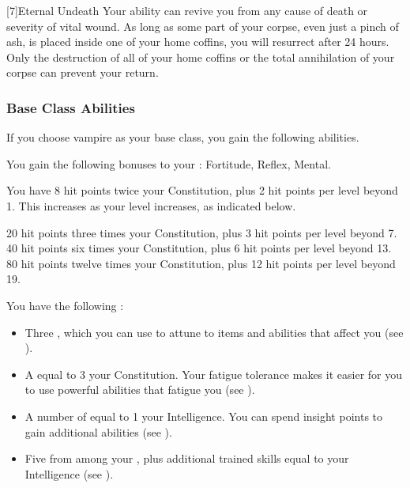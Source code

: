             [7]{Eternal Undeath} Your  ability can revive you from any cause of death or severity of vital wound.
            As long as some part of your corpse, even just a pinch of ash, is placed inside one of your home coffins, you will resurrect after 24 hours.
            Only the destruction of all of your home coffins or the total annihilation of your corpse can prevent your return.

        \subsubsection{Base Class Abilities}
            If you choose vampire as your base class, you gain the following abilities.

            You gain the following bonuses to your :  Fortitude,  Reflex,  Mental.

                You have 8 hit points \add twice your Constitution, plus 2 hit points per level beyond 1.
                This increases as your level increases, as indicated below.
                \begin{itemize}
                     20 hit points \add three times your Constitution, plus 3 hit points per level beyond 7.
                     40 hit points \add six times your Constitution, plus 6 hit points per level beyond 13.
                     80 hit points \add twelve times your Constitution, plus 12 hit points per level beyond 19.
                \end{itemize}

             You have the following :
            \begin{itemize}
                \item Three , which you can use to attune to items and abilities that affect you (see ).
                \item A  equal to 3 \add your Constitution.
                    Your fatigue tolerance makes it easier for you to use powerful abilities that fatigue you (see ).
                \item A number of  equal to 1 \add your Intelligence.
                    You can spend insight points to gain additional abilities (see ).
                \item Five  from among your , plus additional trained skills equal to your Intelligence (see ).
            \end{itemize}

